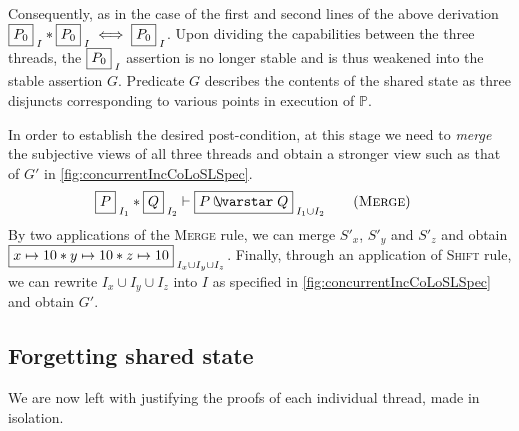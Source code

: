 Consequently, as in the case of the first and second lines of the above derivation $\shared{P_0}{I} * \shared{P_0}{I} \iff \shared{P_0}{I}$. Upon dividing the capabilities between the three threads, the $\shared{P_0}{I}$ assertion is no longer stable and is thus weakened into the stable assertion $G$. Predicate $G$ describes the contents of the shared state as three disjuncts corresponding to various points in execution of $\mathbb{P}$. 


In order to establish the desired post-condition, at this stage we
need to \emph{merge} the subjective views of all three threads and
obtain a stronger view such as that of $G'$ in
\fig\ref{fig:concurrentIncCoLoSLSpec}.
\begin{align*}
  \label{eq:merge}
  \shared{P}{I_1} * \shared{Q}{I_2} &\vdash \shared{P \sepish Q}{I_1 \cup I_2} \tag{\textsc{Merge}}
\end{align*}
By two applications of the \textsc{Merge} rule, we can merge $S'_x$,
$S'_y$ and $S'_z$ and obtain $\shared{\cell{x}{10} * \cell{y}{10} *
  \cell{z}{10}}{I_x \cup I_y \cup I_z}$. Finally, through an
application of \textsc{Shift} rule, we can rewrite $I_x \cup I_y \cup
I_z$ into $I$ as specified in \fig\ref{fig:concurrentIncCoLoSLSpec}
and obtain $G'$.



\subsection{Forgetting shared state}
\label{subsec:hide}

We are now left with justifying the proofs of each individual thread,
made in isolation.


